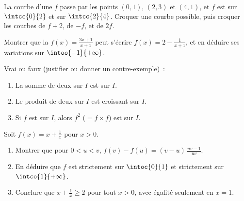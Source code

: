 \begin{exercise}[$\star\star$]\label{exo:g11:func:8}
La courbe d'une  $f$ passe par les points $(0, 1)$, $(2, 3)$ et
$(4, 1)$, et $f$ est  sur $\intcc{0}{2}$ et  sur
$\intcc{2}{4}$. Croquer une courbe possible, puis croquer les courbes de
$f + 2$, de $-f$, et de $2f$.
\end{exercise}

\begin{exercise}[$\star\star$]\label{exo:g11:func:9}
Montrer que la  $f(x) = \frac{2x+1}{x+1}$ peut s'écrire
$f(x) = 2 - \frac{1}{x+1}$, et en déduire ses variations sur
$\intoo{-1}{+\infty}$.
\end{exercise}

\begin{exercise}[$\star\star$]\label{exo:g11:func:10}
Vrai ou faux (justifier ou donner un contre-exemple)~:
\begin{enumerate}
  \item La somme de deux  sur $I$ est  sur
        $I$.
  \item Le produit de deux  sur $I$ est croissant
        sur $I$.
  \item Si $f$ est  sur $I$, alors $f^2$ ($= f \times f$) est
         sur $I$.
\end{enumerate}
\end{exercise}

\begin{exercise}[$\star\star\star$]\label{exo:g11:func:11}
Soit $f(x) = x + \frac{1}{x}$ pour $x > 0$.
\begin{enumerate}
  \item Montrer que pour $0 < u < v$,
        $f(v) - f(u) = (v - u)\,\frac{uv - 1}{uv}$.
  \item En déduire que $f$ est strictement  sur
        $\intoc{0}{1}$ et strictement  sur
        $\intco{1}{+\infty}$.
  \item Conclure que $x + \frac1x \geq 2$ pour tout $x > 0$, avec
        égalité seulement en $x = 1$.
\end{enumerate}
\end{exercise}

